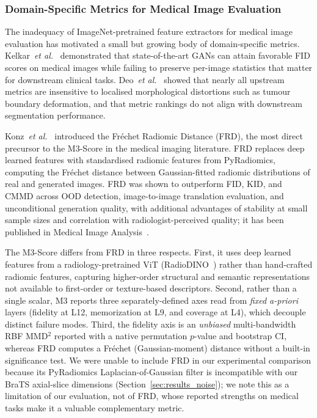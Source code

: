 \documentclass[lettersize,journal]{IEEEtran}
\begin{document}
\subsubsection{Domain-Specific Metrics for Medical Image Evaluation}
\label{sec:related_medical}

The inadequacy of ImageNet-pretrained feature extractors for medical image
evaluation has motivated a small but growing body of domain-specific metrics.
Kelkar~\textit{et al.}~\cite{kelkar2023assessing} demonstrated that
state-of-the-art GANs can attain favorable FID scores on medical images
while failing to preserve per-image statistics that matter for downstream
clinical tasks. Deo~\textit{et al.}~\cite{deo2025metrics} showed that
nearly all upstream metrics are insensitive to localised morphological
distortions such as tumour boundary deformation, and that metric rankings
do not align with downstream segmentation performance.

Konz~\textit{et al.}~\cite{konz2025frd} introduced the Fr\'{e}chet
Radiomic Distance (FRD), the most direct precursor to the M3-Score in
the medical imaging literature. FRD replaces deep learned features with
standardised radiomic features from PyRadiomics, computing the
Fr\'{e}chet distance between Gaussian-fitted radiomic distributions of
real and generated images. FRD was shown to outperform FID, KID, and CMMD
across OOD detection, image-to-image translation evaluation, and
unconditional generation quality, with additional advantages of stability
at small sample sizes and correlation with radiologist-perceived quality;
it has been published in Medical Image Analysis~\cite{konz2025frd}.

The M3-Score differs from FRD in three respects. First, it uses deep learned
features from a radiology-pretrained ViT (RadioDINO~\cite{perezrad}) rather than
hand-crafted radiomic features, capturing higher-order structural and semantic
representations not available to first-order or texture-based descriptors.
Second, rather than a single scalar, M3 reports three separately-defined axes
read from \emph{fixed a-priori} layers (fidelity at L12, memorization at L9, and
coverage at L4), which decouple distinct failure modes. Third, the fidelity axis
is an \emph{unbiased} multi-bandwidth RBF MMD$^2$ reported with a native
permutation $p$-value and bootstrap CI, whereas FRD computes a Fr\'{e}chet
(Gaussian-moment) distance without a built-in significance test. We were unable
to include FRD in our experimental comparison because its PyRadiomics
Laplacian-of-Gaussian filter is incompatible with our BraTS axial-slice
dimensions (Section~\ref{sec:results_noise}); we note this as a limitation of
our evaluation, not of FRD, whose reported strengths on medical tasks make it a
valuable complementary metric.
\end{document}
